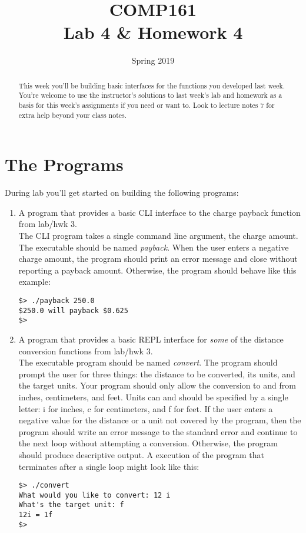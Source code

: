 \documentclass[nobib]{tufte-handout}
\title{COMP161 \\ Lab 4 \& Homework 4}
\author{}
\date{Spring 2019}
\begin{document}
\maketitle
\thispagestyle{empty}

\begin{abstract}
This week you'll be building basic interfaces for the functions you developed last week. You're welcome to use the instructor's solutions to last week's lab and homework as a basis for this week's assignments if you need or want to.  Look to lecture notes 7 for extra help beyond your class notes. 
\end{abstract}

\section{The Programs}

During lab you'll get started on building the following programs:
\begin{enumerate}
\item A program that provides a basic CLI interface to the charge payback function from lab/hwk 3. \\
The CLI program takes a single command line argument, the charge amount. The executable should be named \textit{payback}. When the user enters a negative charge amount, the program should print an error message and close without reporting a payback amount. Otherwise, the program should behave like this example:
\begin{verbatim}
$> ./payback 250.0
$250.0 will payback $0.625
$>
\end{verbatim}


\item A program that provides a basic REPL interface for \textit{some} of the distance conversion functions from lab/hwk 3. \\
The executable program should be named \textit{convert}. The program should prompt the user for three things: the distance to be converted, its units, and the target units. Your program should only allow the conversion to and from inches, centimeters, and feet. Units can and should be specified by a single letter: i for inches, c for centimeters, and f for feet. If the user enters a negative value for the distance or a unit not covered by the program, then the program should write an error message to the standard error and continue to the next loop without attempting a conversion. Otherwise, the program should produce descriptive output. A execution of the program that terminates after a single loop might look like this:
\begin{verbatim}
$> ./convert
What would you like to convert: 12 i
What's the target unit: f
12i = 1f
$>
\end{verbatim}
\end{enumerate}
\end{document}

